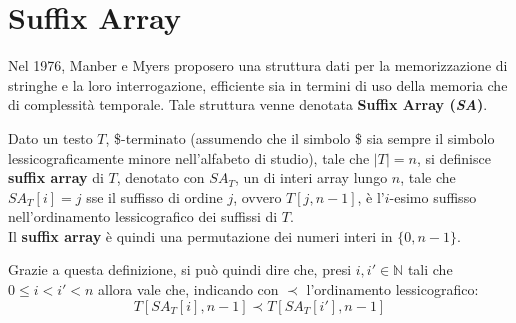 \section{Suffix Array}
Nel 1976, Manber e Myers \cite{sa} proposero una struttura dati per la
memorizzazione di 
stringhe e la loro interrogazione, efficiente sia in termini di uso della
memoria che di complessità temporale. Tale struttura venne denotata
\textbf{Suffix Array (\textit{SA})}.
\begin{definizione}
  Dato un testo $T$, \$-terminato (assumendo che il simbolo \$ sia sempre il
  simbolo lessicograficamente minore nell'alfabeto di studio), tale che $|T|=n$,
  si definisce \textbf{suffix 
    array} di $T$, denotato con $SA_T$, un di interi array lungo $n$, tale che
  $SA_T[i]=j$ sse il suffisso di ordine $j$, ovvero $T[j,n-1]$, è
  l'$i$-esimo suffisso nell’ordinamento lessicografico dei suffissi di $T$. \\
  Il \textbf{suffix array} è quindi una permutazione dei numeri interi in
  $\{0,n-1\}$. 
\end{definizione}
Grazie a questa definizione, si può quindi dire che, presi $i,i'\in \mathbb{N}$
tali che $0\leq i < i' < n$ allora vale che, indicando con $\prec$
l'ordinamento lessicografico:
\[T[SA_T[i],n-1] \prec T[SA_T[i'],n-1]\]

